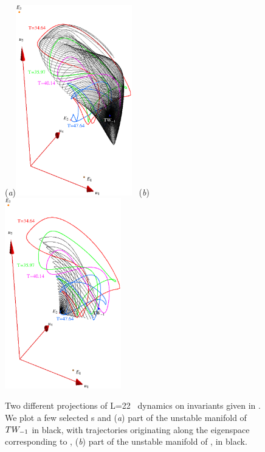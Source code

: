 \begin{figure}[t]
\begin{center}
  (\textit{a})\includegraphics[width=0.45\textwidth, clip=true]{../figs/ks22tw1umInv}
~(\textit{b})\includegraphics[width=0.45\textwidth, clip= true]{../figs/ks22-2wUMInv}
\end{center}
\caption[\KS\  reduced \statesp\ projection, $\REQV{-}{1}$ and $\EQV{1}$ unstable manifolds]
{Two different projections of L=22 \KS\ dynamics on invariants
given in . We plot a few selected {\rpo s} and  (\textit{a}) part of 
the unstable manifold of 
$\REQV{-}{1}$ in black, with trajectories originating along the eigenspace 
corresponding to \eigExp[1],  (\textit{b}) part of the unstable manifold of , in black.}
\label{fig:TW1-E2red}
\end{figure}

